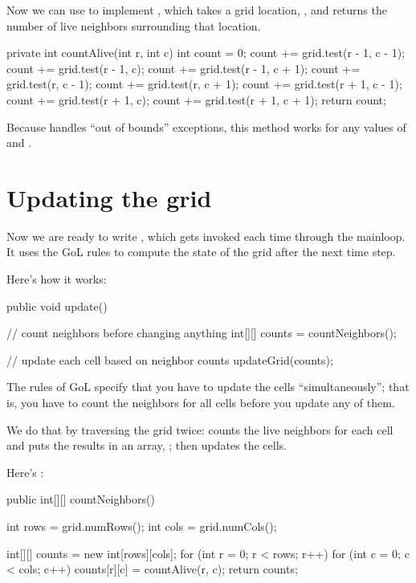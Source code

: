 Now we can use  to implement , which takes a grid location, , and returns the number of live neighbors surrounding that location.

\begin{code}
private int countAlive(int r, int c) {
    int count = 0;
    count += grid.test(r - 1, c - 1);
    count += grid.test(r - 1, c);
    count += grid.test(r - 1, c + 1);
    count += grid.test(r, c - 1);
    count += grid.test(r, c + 1);
    count += grid.test(r + 1, c - 1);
    count += grid.test(r + 1, c);
    count += grid.test(r + 1, c + 1);
    return count;
}
\end{code}

Because  handles ``out of bounds'' exceptions, this method works for any values of  and .


\section{Updating the grid}
\label{sec:update}

Now we are ready to write , which gets invoked each time through the mainloop.
It uses the GoL rules to compute the state of the grid after the next time step.

Here's how it works:

\begin{code}
    public void update() {
		// count neighbors before changing anything
        int[][] counts = countNeighbors();

        // update each cell based on neighbor counts
        updateGrid(counts);
    }
\end{code}

The rules of GoL specify that you have to update the cells ``simultaneously''; that is, you have to count the neighbors for all cells before you update any of them.

We do that by traversing the grid twice:  counts the live neighbors for each cell and puts the results in an array, ; then  updates the cells.

Here's :

\begin{code}
	public int[][] countNeighbors() {
        int rows = grid.numRows();
        int cols = grid.numCols();

        int[][] counts = new int[rows][cols];
        for (int r = 0; r < rows; r++) {
            for (int c = 0; c < cols; c++) {
                counts[r][c] = countAlive(r, c);
            }
        }
		return counts;
	}
\end{code}

